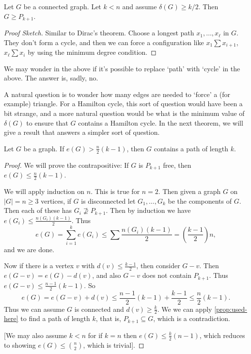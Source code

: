 \documentclass[a4paper]{scrreprt}
\begin{document}
\begin{proposition}\label{prop:used-here}
	Let $G$ be a connected graph. Let $k < n$ and assume $\delta(G) \geq k/2$. Then $G \geq P_{k + 1}$.
\end{proposition}
\begin{proof}[Proof Sketch]
	Similar to Dirac's theorem. Choose a longest path $x_1, \dots, x_\ell$ in $G$. They don't form a cycle, and then we can force a configuration like $x_1 \sum x_{i + 1}$, $x_{\ell} \sum x_i$ by using the minimum degree condition.
\end{proof}

We may wonder in the above if it's possible to replace `path' with `cycle' in the above. The answer is, sadly, no.

A natural question is to wonder how many edges are needed to `force' a (for example) triangle.
For a Hamilton cycle, this sort of question would have been a bit strange, and a more natural question would be what is the minimum value of $\delta(G)$ to ensure that $G$ contains a Hamilton cycle.
In the next theorem, we will give a result that answers a simpler sort of question.

\begin{theorem}
	Let $G$ be a graph. If $e(G) > \frac{n}{2}(k - 1)$, then $G$ contains a path of length $k$.
\end{theorem}
\begin{proof}
	We will prove the contrapositive: If $G$ is $P_{k + 1}$ free, then $e(G) \leq \frac{n}{2}(k - 1)$.

	We will apply induction on $n$. This is true for $n = 2$.
	Then given a graph $G$ on $|G| = n \geq 3$ vertices, if $G$ is disconnected let $G_1, \dots, G_k$ be the components of $G$. Then each of these has $G_i \not \supseteq P_{k + 1}$. Then by induction we have $e(G_i) \leq \frac{n(G_i)(k - 1)}{2}$. Thus
	$$
	e(G) = \sum_{i = 1}^k e(G_i) \leq \sum \frac{n(G_i)(k - 1)}{2} = \left(\frac{k - 1}{2}\right)n,
	$$
	and we are done.

	Now if there is a vertex $v$ with $d(v) \leq \frac{k - 1}{2}$, then consider $G - v$. Then $e(G - v) = e(G) - d(v)$, and also $G - v$ does not contain $P_{k + 1}$. Thus $e(G - v) \leq \frac{n - 1}{2}(k - 1)$. So
	$$
	e(G) = e(G - v) + d(v) \leq \frac{n - 1}{2}(k - 1) + \frac{k -1}{2} \leq \frac{n}{2}(k - 1).
	$$
	Thus we can assume $G$ is connected and $d(v)  \geq \frac{k}{2}$.
	We we can apply \autoref{prop:used-here} to find a path of length $k$, that is, $P_{k + 1} \subseteq G$, which is a contradiction.

	[We may also assume $k < n$ for if $k = n$ then $e(G) \leq \frac{k}{2}(n - 1)$, which reduces to showing $e(G) \leq \binom{n}{2}$, which is trivial].
\end{proof}
\end{document}
